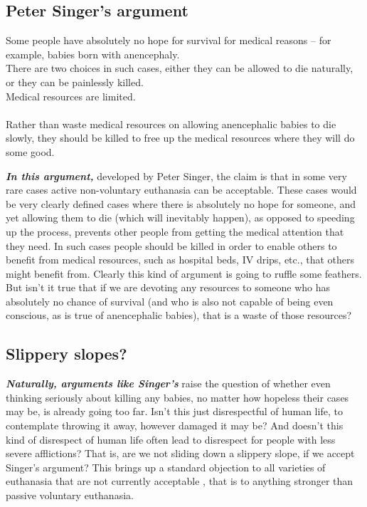 \documentclass[12pt, openany]{book}
\begin{document}
\hypertarget{peter-singers-argument}{%
\subsection*{Peter Singer's argument}\label{peter-singers-argument}}


\begin{center}

\begin{argument}

Some people have absolutely no hope for survival for medical reasons -- for example, babies born with anencephaly.\\
There are two choices in such cases, either they can be allowed to die naturally, or they can be painlessly killed.\\
Medical resources are limited.\\
~\\
Rather than waste medical resources on allowing anencephalic babies to die slowly, they should be killed to free up the medical resources where they will do some good.

\end{argument}

\end{center}

\textbf{\emph{In this argument,}} developed by Peter Singer, the claim is that in some very rare cases active non-voluntary euthanasia can be acceptable. These cases would be very clearly defined cases where there is absolutely no hope for someone, and yet allowing them to die (which will inevitably happen), as opposed to speeding up the process, prevents other people from getting the medical attention that they need. In such cases people should be killed in order to enable others to benefit from medical resources, such as hospital beds, IV drips, etc., that others might benefit from. Clearly this kind of argument is going to ruffle some feathers. But isn't it true that if we are devoting any resources to someone who has absolutely no chance of survival (and who is also not capable of being even conscious, as is true of anencephalic babies), that is a waste of those resources?

\hypertarget{slippery-slopes}{%
\subsection*{Slippery slopes?}\label{slippery-slopes}}


\textbf{\emph{Naturally, arguments like Singer's}} raise the question of whether even thinking seriously about killing any babies, no matter how hopeless their cases may be, is already going too far. Isn't this just disrespectful of human life, to contemplate throwing it away, however damaged it may be? And doesn't this kind of disrespect of human life often lead to disrespect for people with less severe afflictions? That is, are we not sliding down a slippery slope, if we accept Singer's argument? This brings up a standard objection to all varieties of euthanasia that are not currently acceptable , that is to anything stronger than passive voluntary euthanasia.
\end{document}

